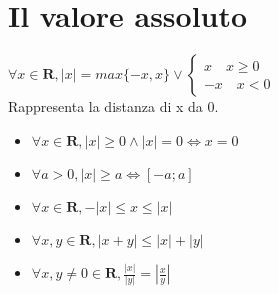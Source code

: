 \chapter{Il valore assoluto}
$\forall x\in \mathbf{R}, |x|=max\{-x,x\}\lor\begin{cases}x \quad x\ge 0\\-x \quad x<0\end{cases}$\\
Rappresenta la distanza di x da 0.\\
\begin{itemize}
\item $\forall x\in \mathbf{R}, |x|\ge 0\wedge |x|=0 \Leftrightarrow x=0$
\item $\forall a>0, |x|\ge a \Leftrightarrow [-a; a]$
\item $\forall x \in \mathbf{R}, -|x|\le x \le |x|$
\item $\forall x, y \in \mathbf{R}, |x+y| \le |x|+|y|$
\item $\forall x, y\neq 0 \in \mathbf{R}, \frac{|x|}{|y|} =|\frac{x}{y}|$ 
\end{itemize}